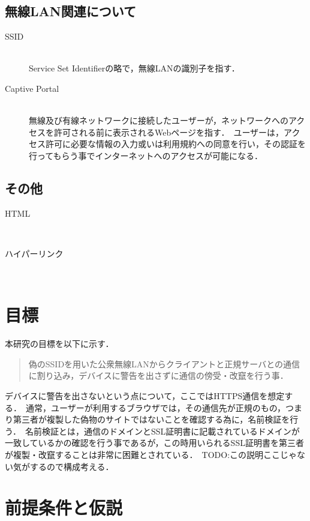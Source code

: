 \documentclass[dvipdfmx]{jsarticle}
\begin{document}
        \subsection{無線LAN関連について}
            \begin{description}
                \item [SSID]\mbox{}\\
                    Service Set Identifierの略で，無線LANの識別子を指す．
                \item [Captive Portal]\mbox{}\\
                    無線及び有線ネットワークに接続したユーザーが，ネットワークへのアクセスを許可される前に表示されるWebページを指す．\
                    ユーザーは，アクセス許可に必要な情報の入力或いは利用規約への同意を行い，その認証を行ってもらう事でインターネットへのアクセスが可能になる．\
            \end{description}
        \subsection{その他}
            \begin{description}
                \item[HTML]\mbox{}\\
                \item[ハイパーリンク]\mbox{}\\  
            \end{description}
    \section{目標}
        本研究の目標を以下に示す．
        \begin{quote}
            偽のSSIDを用いた公衆無線LANからクライアントと正規サーバとの通信に割り込み，デバイスに警告を出さずに通信の傍受・改竄を行う事．\
        \end{quote}
        デバイスに警告を出さないという点について，ここではHTTPS通信を想定する．\
        通常，ユーザーが利用するブラウザでは，その通信先が正規のもの，つまり第三者が複製した偽物のサイトではないことを確認する為に，名前検証を行う．\
        名前検証とは，通信のドメインとSSL証明書に記載されているドメインが一致しているかの確認を行う事であるが，この時用いられるSSL証明書を第三者が複製・改竄することは非常に困難とされている．\
        TODO:この説明ここじゃない気がするので構成考える．
    \section{前提条件と仮説}
\end{document}
